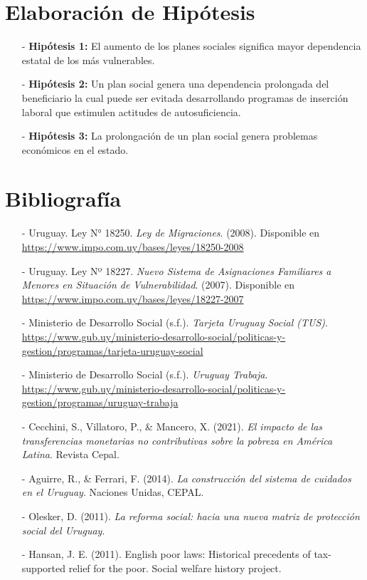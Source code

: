 \documentclass{article}
\begin{document}
\section{Elaboración de Hipótesis}

\begin{itemize}
	\item[-] \textbf{Hipótesis 1:} El aumento de los planes sociales significa mayor dependencia estatal de los más vulnerables.
	\item[-] \textbf{Hipótesis 2:} Un plan social genera una dependencia prolongada del beneficiario la cual puede ser evitada desarrollando programas de inserción laboral que estimulen actitudes de autosuficiencia.
	\item[-] \textbf{Hipótesis 3:} La prolongación de un plan social genera problemas económicos en el estado.
\end{itemize}

\pagebreak

\section{Bibliografía}

\begin{itemize}
	\item[-] Uruguay. Ley N° 18250. \textit{Ley de Migraciones}. (2008). Disponible en \url{https://www.impo.com.uy/bases/leyes/18250-2008}
    \item[-] Uruguay. Ley Nº 18227. \textit{Nuevo Sistema de Asignaciones Familiares a Menores en Situación de Vulnerabilidad}. (2007). Disponible en \url{https://www.impo.com.uy/bases/leyes/18227-2007}
    \item[-] Ministerio de Desarrollo Social (s.f.). \textit{Tarjeta Uruguay Social (TUS)}. \url{https://www.gub.uy/ministerio-desarrollo-social/politicas-y-gestion/programas/tarjeta-uruguay-social}
    \item[-] Ministerio de Desarrollo Social (s.f.). \textit{Uruguay Trabaja}. \url{https://www.gub.uy/ministerio-desarrollo-social/politicas-y-gestion/programas/uruguay-trabaja}
    \item[-] Cecchini, S., Villatoro, P., \& Mancero, X. (2021). \textit{El impacto de las transferencias monetarias no contributivas sobre la pobreza en América Latina}. Revista Cepal.
    \item[-] Aguirre, R., \& Ferrari, F. (2014). \textit{La construcción del sistema de cuidados en el Uruguay}. Naciones Unidas, CEPAL.
    \item[-] Olesker, D. (2011). \textit{La reforma social: hacia una nueva matriz de protección social del Uruguay}.
    \item[-] Hansan, J. E. (2011). English poor laws: Historical precedents of tax-supported relief for the poor. Social welfare history project.
\end{itemize}
\end{document}
